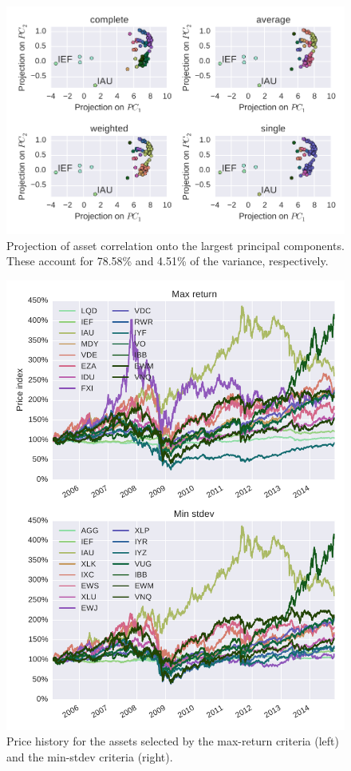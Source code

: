 \begin{figure}[tp]
\centering
\includegraphics{pic/pca_methods.pdf}
\caption{Projection of asset correlation onto the largest principal components. These account for 78.58\% and 4.51\% of the variance, respectively.}
\label{fig:bondsyield}
\end{figure}

\begin{figure}[tp]
\centering
\includegraphics{pic/prices_selected_assets.pdf}
\caption{Price history for the assets selected by the max-return criteria (left) and the min-stdev criteria (right).}
\label{fig:bondsyield}
\end{figure}
